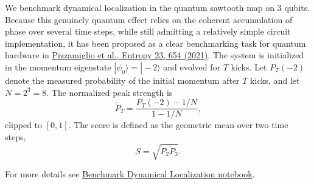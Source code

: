 We benchmark dynamical localization in the quantum sawtooth map on 3 qubits.
Because this genuinely quantum effect relies on the coherent accumulation of phase over several time steps, while still admitting a relatively simple circuit implementation, it has been proposed as a clear benchmarking task for quantum hardware in \href{https://arxiv.org/abs/2105.10813}{Pizzamiglio et al., Entropy 23, 654 (2021)}. The system is initialized in the momentum eigenstate \(|\psi_0\rangle = |-2\rangle\) and evolved for \(T\) kicks. Let \(P_T(-2)\) denote the measured probability of the initial momentum after \(T\) kicks, and let \(N=2^3=8\). The normalized peak strength is
\[
\tilde{P}_T = \frac{P_T(-2) - 1/N}{1 - 1/N},
\]
clipped to \([0,1]\). The score is defined as the geometric mean over two time steps,
\[
S = \sqrt{\tilde{P}_2 \tilde{P}_3}.
\]
\smallskip

For more details see \href{https://github.com/softqlib/softqlib-quantum-algorithms/tree/main/benchmarking/benchmarks/benchmark\_dynamical\_localization.ipynb}{Benchmark Dynamical Localization notebook}.
\medskip
